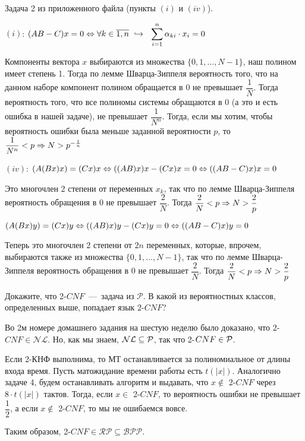 \documentclass[a4paper,12pt]{article}
\begin{document}
\begin{task}
	Задача 2 из приложенного файла (пункты $(i)$ и $(iv)$). 
\end{task}

\begin{solution}
$(i)$: $(AB - C)x = 0 \LRa \forall k \in \ol{1, n} \ \vyp \ \ \displaystyle \sum_{i = 1}^{n} \alpha_{ki} \cdot x_i = 0$
	
	Компоненты вектора $x$ выбираются из множества $\{0, 1, \ldots, N - 1\}$, наш полином имеет степень 1. Тогда по лемме Шварца-Зиппеля вероятность того, что на данном наборе компонент полином обращается в 0 не превышает $\dfrac1N$. Тогда вероятность того, что все полиномы системы обращаются в 0 (а это и есть ошибка в нашей задаче), не превышает $\dfrac1{N^n}$. Тогда, если мы хотим, чтобы вероятность ошибки была меньше заданной вероятности $p$, то $\dfrac1{N^n} < p \Ra N > p^{-\frac1n}$
	
	\vspace{3mm}
	
$(iv)$: $(A(Bx)x)=(Cx)x \LRa ((AB)x)x - (Cx)x = 0 \LRa ((AB-C)x)x = 0$

Это многочлен 2 степени от переменных $x_k$, так что по лемме Шварца-Зиппеля вероятность обращения в 0 не превышает $\dfrac2N$. Тогда $\dfrac2N < p \Ra N > \dfrac2p$

$(A(Bx)y)=(Cx)y \LRa ((AB)x)y - (Cx)y = 0 \LRa ((AB-C)x)y = 0$

Теперь это многочлен 2 степени от $2n$ переменных, которые, впрочем, выбираются также из множества $\{0, 1, \ldots, N - 1\}$, так что по лемме Шварца-Зиппеля вероятность обращения в 0 не превышает $\dfrac2N$. Тогда $\dfrac2N < p \Ra N > \dfrac2p$
\end{solution}

\begin{tasknum}{7}
	Докажите, что 2-$CNF$~---~задача из $\mathcal{P}$. В какой из вероятностных классов, определенных выше, попадает язык 2-$CNF$?
\end{tasknum}

\begin{solution}
	Во 2м номере домашнего задания на шестую неделю было доказано, что 2-$CNF \in \mathcal{NL}$. Но, как мы знаем, $\mathcal{NL} \subseteq \P$, так что 2-$CNF \in \P$.
	
	Если 2-КНФ выполнима, то МТ останавливается за полиномиальное от длины входа время. Пусть матожидание времени работы есть $t(|x|)$. Аналогично задаче 4, будем останавливать алгоритм и выдавать, что $x \notin$ 2-$CNF$ через $8 \cdot t(|x|)$ тактов. Тогда, если $x \in$ 2-$CNF$, то вероятность ошибки не превышает $\dfrac{1}{2}$, а если $x \notin$ 2-$CNF$, то мы не ошибаемся вовсе.
	
	Таким образом, 2-$CNF \in \mathcal{RP} \subseteq \mathcal{BPP}$.
\end{solution}
\end{document}
